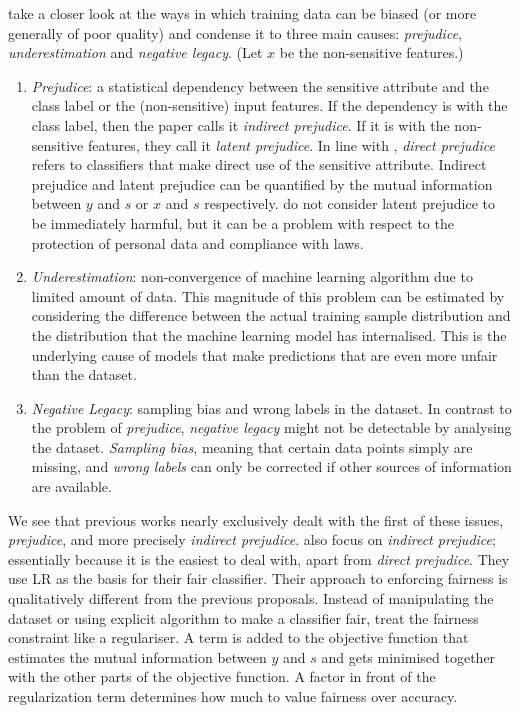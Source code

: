 \citet{kamishima2012fairness} take a closer look
at the ways in which training data can be biased (or more generally of poor quality) and condense it to three main causes:
\emph{prejudice}, \emph{underestimation} and \emph{negative legacy}.
(Let \(x\) be the non-sensitive features.)

\begin{enumerate}
\item
  \emph{Prejudice}:
  a statistical dependency between the sensitive attribute
  and the class label or the (non-sensitive) input features.
  If the dependency is with the class label, then the paper calls it \emph{indirect prejudice}.
  If it is with the non-sensitive features, they call it \emph{latent prejudice}.
  In line with \citet{pedreshi2008discrimination},
  \emph{direct prejudice} refers to classifiers that make direct use of the sensitive attribute.
  Indirect prejudice and latent prejudice can be quantified by
  the mutual information between \(y\) and \(s\) or \(x\) and \(s\) respectively.
  \citet{kamishima2012fairness} do not consider latent prejudice to be immediately harmful,
  but it can be a problem with respect to the protection of personal data and compliance with laws.
\item
  \emph{Underestimation}:
  non-convergence of machine learning algorithm due to limited amount of data.
  This magnitude of this problem can be estimated
  by considering the difference between the actual training sample distribution
  and the distribution that the machine learning model has internalised.
  This is the underlying cause of models that make predictions
  that are even more unfair than the dataset.
\item
  \emph{Negative Legacy}:
  sampling bias and wrong labels in the dataset.
  In contrast to the problem of \emph{prejudice},
  \emph{negative legacy} might not be detectable by analysing the dataset.
  \emph{Sampling bias}, meaning that certain data points simply are missing,
  and \emph{wrong labels} can only be corrected if other sources of information are available.
\end{enumerate}

We see that previous works nearly exclusively dealt with the first of these issues, \emph{prejudice},
and more precisely \emph{indirect prejudice}.
\citet{kamishima2012fairness} also focus on \emph{indirect prejudice};
essentially because it is the easiest to deal with, apart from \emph{direct prejudice}.
They use \acf{LR} as the basis for their fair classifier.
Their approach to enforcing fairness is qualitatively different from the previous proposals.
Instead of manipulating the dataset or using explicit algorithm to make a classifier fair,
\citet{kamishima2012fairness} treat the fairness constraint like a regulariser.
A term is added to the objective function
that estimates the mutual information between \(y\) and \(s\)
and gets minimised together with the other parts of the objective function.
A factor in front of the regularization term determines how much to value fairness over accuracy.

